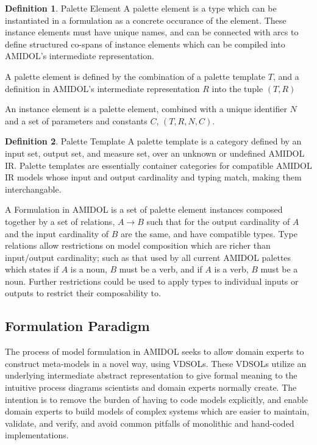\documentclass[11pt]{article}
\theoremstyle{definition}
\newtheorem{definition}{Definition}[section]
\newcommand{\amidol}{\textsc{AMIDOL}}
\begin{document}
\begin{definition}{Palette Element}
  A palette element is a type which can be instantiated in a
  formulation as a concrete occurance of the element.  These instance
  elements must have unique names, and can be connected with arcs to
  define structured co-spans of instance elements which can be
  compiled into \amidol{}'s intermediate representation.

  A palette element is defined by the combination of a palette
  template $T$, and a definition in \amidol{}'s intermediate
  representation $R$ into the tuple $(T,R)$

  An instance element is a palette element, combined with a unique
  identifier $N$ and a set of parameters and constants $C$, $(T, R, N,
  C)$.
\end{definition}

\begin{definition}{Palette Template}
  A palette template is a category defined by an input set, output
  set, and measure set, over an unknown or undefined \amidol{} IR.
  Palette templates are essentially container categories for
  compatible \amidol{} IR models whose input and output cardinality
  and typing match, making them interchangable.
\end{definition}

A Formulation in \amidol{} is a set of palette element instances
composed together by a set of relations, $A \rightarrow B$ such that
for the output cardinality of $A$ and the input cardinality of $B$ are
the same, and have compatible types.  Type relations allow
restrictions on model composition which are richer than input/output
cardinality; such as that used by all current \amidol{} palettes which
states if $A$ is a noun, $B$ must be a verb, and if $A$ is a verb, $B$
must be a noun.  Further restrictions could be used to apply types to
individual inputs or outputs to restrict their composability to.

\subsection{Formulation Paradigm}

The process of model formulation in \amidol{} seeks to allow domain
experts to construct meta-models in a novel way, using VDSOLs.  These
VDSOLs utilize an
underlying intermediate abstract representation to give formal meaning
to the intuitive process diagrams scientists and domain experts
normally create.  The intention is to remove the burden of having to
code models explicitly, and enable domain experts to build models of
complex systems which are easier to maintain, validate, and verify,
and avoid common pitfalls of monolithic and hand-coded
implementations.
\end{document}
